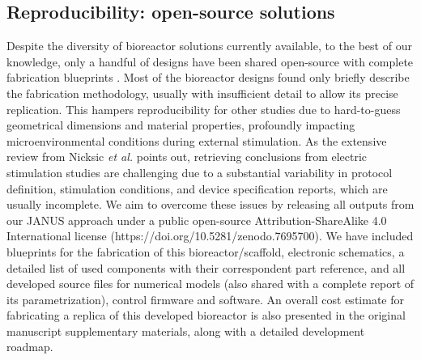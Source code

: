\subsection{Reproducibility: open-source solutions}
Despite the diversity of bioreactor solutions currently available, to the best of our knowledge, only a handful of designs have been shared open-source with complete fabrication blueprints \cite{Daneshgar2019-tu, Raveling2018-gl}. Most of the bioreactor designs found only briefly describe the fabrication methodology, usually with insufficient detail to allow its precise replication. This hampers reproducibility for other studies due to hard-to-guess geometrical dimensions and material properties, profoundly impacting microenvironmental conditions during external stimulation. As the extensive review from Nicksic \textit{et al.} \cite{Nicksic2022-jy} points out, retrieving conclusions from electric stimulation studies are challenging due to a substantial variability in protocol definition, stimulation conditions, and device specification reports, which are usually incomplete. We aim to overcome these issues by releasing all outputs from our JANUS approach under a public open-source Attribution-ShareAlike 4.0 International license (https://doi.org/10.5281/zenodo.7695700). We have included blueprints for the fabrication of this bioreactor/scaffold, electronic schematics, a detailed list of used components with their correspondent part reference, and all developed source files for numerical models (also shared with a complete report of its parametrization), control firmware and software. An overall cost estimate for fabricating a replica of this developed bioreactor is also presented in the original manuscript supplementary materials, along with a detailed development roadmap.


